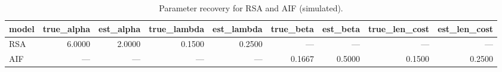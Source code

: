 \begin{table}[!ht]
\centering
\begin{table}
\caption{Parameter recovery for RSA and AIF (simulated).}
\label{tab:fig08}
\begin{tabular}{lrrrrrrrr}
\toprule
model & true\_alpha & est\_alpha & true\_lambda & est\_lambda & true\_beta & est\_beta & true\_len\_cost & est\_len\_cost \\
\midrule
RSA & 6.0000 & 2.0000 & 0.1500 & 0.2500 & --- & --- & --- & --- \\
AIF & --- & --- & --- & --- & 0.1667 & 0.5000 & 0.1500 & 0.2500 \\
\bottomrule
\end{tabular}
\end{table}
\end{table}
